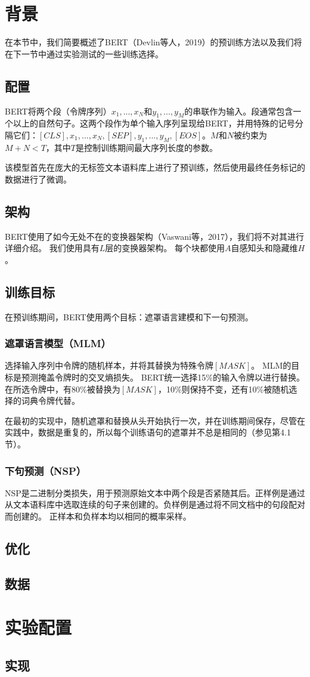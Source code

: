 \documentclass[lang=cn,11pt,a4paper,twocolumn]{elegantpaper}
\begin{document}
\section{背景}
在本节中，我们简要概述了BERT（Devlin等人，2019）的预训练方法以及我们将在下一节中通过实验测试的一些训练选择。
\subsection{配置}
BERT将两个段（令牌序列）$x_1,...,x_N$和$y_1,...,y_M$的串联作为输入。段通常包含一个以上的自然句子。这两个段作为单个输入序列呈现给BERT，并用特殊的记号分隔它们：$[CLS],x_1,...,x_N,[SEP],y_1,...,y_M,[EOS]$。$M$和$N$被约束为$M+N<T$，其中$T$是控制训练期间最大序列长度的参数。

该模型首先在庞大的无标签文本语料库上进行了预训练，然后使用最终任务标记的数据进行了微调。

\subsection{架构}
BERT使用了如今无处不在的变换器架构（Vaswani等，2017），我们将不对其进行详细介绍。 我们使用具有$L$层的变换器架构。 每个块都使用$A$自感知头和隐藏维$H$。

\subsection{训练目标}
在预训练期间，BERT使用两个目标：遮罩语言建模和下一句预测。
\subsubsection{遮罩语言模型（MLM）}
选择输入序列中令牌的随机样本，并将其替换为特殊令牌$[MASK]$。 MLM的目标是预测掩盖令牌时的交叉熵损失。 BERT统一选择15\%的输入令牌以进行替换。 在所选令牌中，有80\%被替换为$[MASK]$，10\%则保持不变，还有10\%被随机选择的词典令牌代替。

在最初的实现中，随机遮罩和替换从头开始执行一次，并在训练期间保存，尽管在实践中，数据是重复的，所以每个训练语句的遮罩并不总是相同的（参见第4.1节）。
\subsubsection{下句预测（NSP）}
NSP是二进制分类损失，用于预测原始文本中两个段是否紧随其后。正样例是通过从文本语料库中选取连续的句子来创建的。负样例是通过将不同文档中的句段配对而创建的。 正样本和负样本均以相同的概率采样。

\subsection{优化}

\subsection{数据}

\section{实验配置}

\subsection{实现}

\nocite{*}

\end{document}
